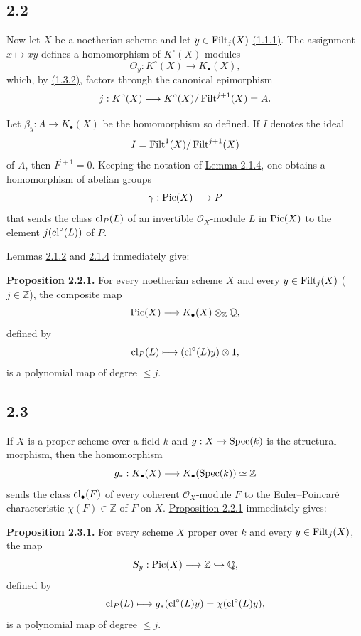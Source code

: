 \subsection*{2.2}
Now let $X$ be a noetherian scheme and let $y\in\operatorname{Filt}_j(X)$ \hyperlink{sga6.e10.def.1-1-1}{(1.1.1)}. The
assignment $x\mapsto xy$ defines a homomorphism of $K^\circ(X)$-modules
\[
\Theta_y:K^\circ(X)\longrightarrow K_\bullet(X),
\]
which, by \hyperlink{sga6.e10.thm.1-3-2}{(1.3.2)}, factors through the canonical epimorphism
\[
j:K^\circ(X)\longrightarrow
K^\circ(X)/\operatorname{Filt}^{j+1}(X)=A.
\]

Let $\beta_y:A\to K_\bullet(X)$ be the homomorphism so defined. If $I$
denotes the ideal
\[
I=\operatorname{Filt}^1(X)/\operatorname{Filt}^{j+1}(X)
\]
of $A$, then $I^{j+1}=0$. Keeping the notation of \hyperlink{sga6.e10.lem.2-1-4}{Lemma 2.1.4}, one obtains a
homomorphism of abelian groups
\[
\gamma:\operatorname{Pic}(X)\longrightarrow P
\]
that sends the class $\operatorname{cl}_P(L)$ of an invertible $\mathcal O_X$-module $L$
in $\operatorname{Pic}(X)$ to the element $j(\operatorname{cl}^\circ(L))$ of $P$.

Lemmas \hyperlink{sga6.e10.lem.2-1-2}{2.1.2} and \hyperlink{sga6.e10.lem.2-1-4}{2.1.4} immediately give:

\textbf{Proposition 2.2.1.}
For every noetherian scheme $X$ and every $y\in\operatorname{Filt}_j(X)$
($j\in\mathbb Z$), the composite map
\[
\operatorname{Pic}(X)\longrightarrow K_\bullet(X)\otimes_{\mathbb Z}\mathbb Q,
\]
defined by
\[
\operatorname{cl}_P(L)\longmapsto(\operatorname{cl}^\circ(L)y)\otimes1,
\]
is a polynomial map of degree $\leq j$.

\subsection*{2.3}
If $X$ is a proper scheme over a field $k$ and
$g:X\to\operatorname{Spec}(k)$ is the structural morphism, then the homomorphism
\[
g_*:K_\bullet(X)\longrightarrow K_\bullet(\operatorname{Spec}(k))\simeq\mathbb Z
\]
sends the class $\operatorname{cl}_\bullet(F)$ of every coherent $\mathcal O_X$-module
$F$ to the Euler--Poincar\'e characteristic $\chi(F)\in\mathbb Z$ of $F$
on $X$. \hyperlink{sga6.e10.prop.2-2-1}{Proposition 2.2.1} immediately gives:

\textbf{Proposition 2.3.1.}
For every scheme $X$ proper over $k$ and every $y\in\operatorname{Filt}_j(X)$, the map
\[
S_y:\operatorname{Pic}(X)\longrightarrow\mathbb Z\hookrightarrow\mathbb Q,
\]
defined by
\[
\operatorname{cl}_P(L)\longmapsto
g_*(\operatorname{cl}^\circ(L)y)=\chi(\operatorname{cl}^\circ(L)y),
\]
is a polynomial map of degree $\leq j$.

